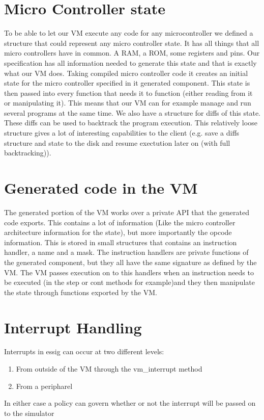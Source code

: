 \documentclass[a4paper]{report}
\begin{document}
\section{Micro Controller state}
To be able to let our VM execute any code for any microcontroller we
defined a structure that could represent any micro controller state. It
has all things that all micro controllers have in common. A RAM, a ROM,
some registers and pins. Our specification has all information needed
to generate this state and that is exactly what our VM does. Taking
compiled micro controller code it creates an initial state for the
micro controller specified in it generated component. This state is
then passed into every function that needs it to function (either
reading from it or manipulating it). This means that our VM can for
example manage and run several programs at the same time. We also have
a structure for diffs of this state. These diffs can be used to
backtrack the program execution. This relatively loose structure gives
a lot of interesting capabilities to the client (e.g. save a diffs
structure and state to the disk and resume exectution later on (with
full backtracking)).

\section{Generated code in the VM}
The generated portion of the VM works over a private API that the
generated code exports. This contains a lot of information (Like the
micro controller architecture information for the state), but more
importantly the opcode information. This is stored in small structures
that contains an instruction handler, a name and a mask. The
instruction handlers are private functions of the generated component,
but they all have the same signature as defined by the VM. The VM
passes execution on to this handlers when an instruction needs to be
executed (in the step or cont methods for example)and they then
manipulate the state through functions exported by the VM.

\section[Interrupt Handling]{Interrupt Handling}
Interrupts in essig can occur at two different levels:

\begin{enumerate}
\item {%
From outside of the VM through the vm\_interrupt method }
\item {%
From a peripharel }
\end{enumerate}
In either case a policy can govern whether or not the interrupt will be
passed on to the simulator
\end{document}
